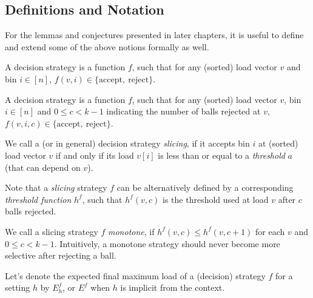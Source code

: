 \subsection{Definitions and Notation} \label{notation}

For the lemmas and conjectures presented in later chapters, it is useful to define and extend some of the above notions formally as well.

\begin{definition} 
A \TwoThinning decision strategy is a function $f$, such that for any (sorted) load vector $v$ and bin $i\in[n]$, $f(v, i)\in\{\mathrm{accept},\ \mathrm{reject}\}$.
\end{definition}


\begin{definition} 
A \KThinning decision strategy is a function $f$, such that for any (sorted) load vector $v$, bin $i\in[n]$ and $0\leq c<k-1$ indicating the number of balls rejected at $v$, $f(v, i, c)\in\{\mathrm{accept},\ \mathrm{reject}\}$.
\end{definition}


\begin{definition} 
We call a \TwoThinning (or \KThinning in general) decision strategy \textit{slicing}, if it accepts bin $i$ at (sorted) load vector $v$ if and only if its load $v[i]$ is less than or equal to a \textit{threshold} $a$ (that can depend on $v$).
\end{definition}


\begin{definition} 
Note that a \KThinning \textit{slicing} strategy $f$ can be alternatively defined by a corresponding \textit{threshold function} $h^f$, such that $h^f(v,c)$ is the threshold used at load $v$ after $c$ balls rejected.
\end{definition}



\begin{definition} 
We call a \KThinning slicing strategy $f$ \textit{monotone}, if $h^f(v,c)\leq h^f(v,c+1)$ for each $v$ and $0\leq c<k-1$. Intuitively, a monotone strategy should never become more selective after rejecting a ball.
\end{definition}


\begin{definition} 
Let's denote the expected final maximum load of a (decision) strategy $f$ for a setting $h$ by $E^f_h$, or $E^f$ when $h$ is implicit from the context.
\end{definition}



